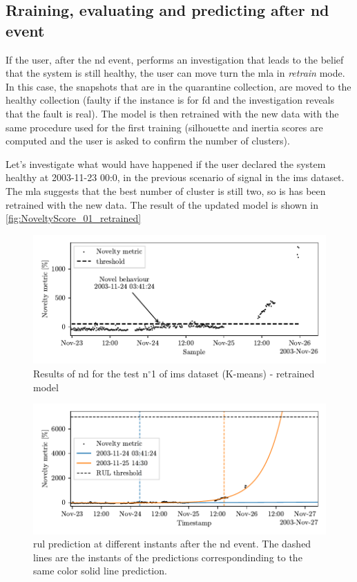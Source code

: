 \subsection{Rraining,  evaluating and predicting after \gls{nd} event}
If the user, after the \gls{nd} event, performs an investigation that leads to the belief that the system is still healthy, the user can move turn the \gls{mla} in \emph{retrain} mode. In this case, the snapshots that are in the quarantine collection, are moved to the healthy collection (faulty if the instance is for \gls{fd} and the investigation reveals that the fault is real). 
The model is then retrained with the new data with the same procedure used for the first training (silhouette and inertia scores are computed and the user is asked to confirm the number of clusters).

Let's investigate what would have happened if the user declared the system healthy at 2003-11-23 00:0, in the previous scenario of   signal in the \gls{ims} dataset. The \gls{mla} suggests that the best number of cluster is still two, so is has been retrained with the new data. The result of the updated model is shown in \autoref{fig:NoveltyScore_01_retrained}


\begin{figure}
    \centering
    \includegraphics{images/IMS/Novelty_01_500samples_bearing3x_retrained.pdf}
    \caption{Results of \gls{nd} for the test $\text{n}^\circ$1 of \gls{ims} dataset (K-means) - retrained model}
    \label{fig:NoveltyScore_01_retrained}
\end{figure}

\begin{figure}
    \centering
    \includegraphics{images/IMS/Novelty_01_500samples_bearing3x_predictions_retrained.pdf}
    \caption{\gls{rul} prediction at different instants after the \gls{nd} event. The dashed lines are the instants of the predictions correspondinding to the same color solid line prediction.}
    \label{fig:RULPredictions01_retrained}
\end{figure}

